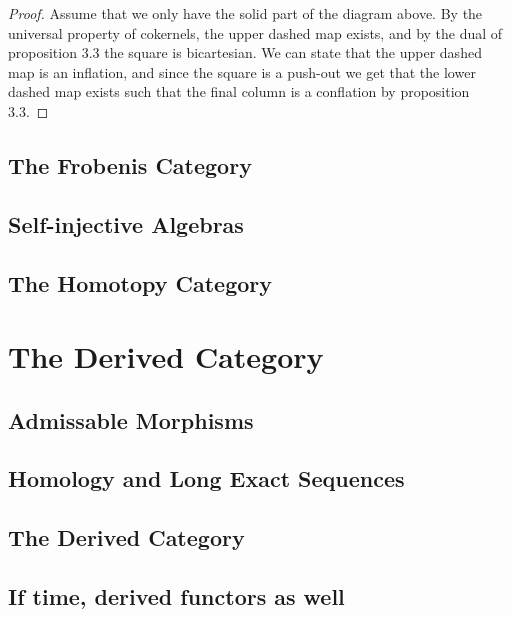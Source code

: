 \documentclass[12pt]{article}
\theoremstyle{definition}
\theoremstyle{remark}
\begin{document}
            \begin{proof}
                Assume that we only have the solid part of the diagram above. By the universal property of cokernels, the upper dashed map exists, and by the dual of proposition 3.3 the square is bicartesian. We can state that the upper dashed map is an inflation, and since the square is a push-out we get that the lower dashed map exists such that the final column is a conflation by proposition 3.3.
            \end{proof}

        \subsection{The Frobenis Category}

        \subsection{Self-injective Algebras}

        \subsection{The Homotopy Category}

    \clearpage

    \section{The Derived Category}

        \subsection{Admissable Morphisms}

        \subsection{Homology and Long Exact Sequences}

        \subsection{The Derived Category}

        \subsection{If time, derived functors as well}

    \clearpage
    
\end{document}
